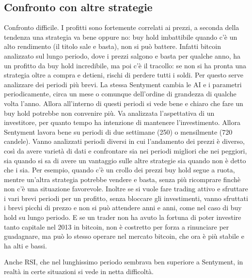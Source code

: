\documentclass[a4paper,12pt]{report}
\begin{document}
\begin{fig}
\section{Confronto con altre strategie}
Confronto difficile. I profitti sono fortemente correlati ai prezzi, a seconda della tendenza una strategia va bene oppure no: buy hold imbattibile quando c'è un alto rendimento (il titolo sale e basta), non si può battere. Infatti bitcoin analizzato sul lungo periodo, dove i prezzi salgono e basta per qualche anno, ha un profitto da buy hold incredibile, ma poi c'è il tracollo: se non si ha pronta una strategia oltre a compra e detieni, rischi di perdere tutti i soldi.
Per questo serve analizzare dei periodi più brevi. La stessa Sentyment cambia le AI e i parametri periodicamente, circa un mese o comunque dell'ordine di grandezza di qualche volta l'anno. Allora all'interno di questi periodi si vede bene e chiaro che fare un buy hold potrebbe non convenire più. Va analizzata l'aspettativa di un investitore, per quanto tempo ha intenzione di mantenere l'investimento.
Allora Sentyment lavora bene su periodi di due settimane (250) o mensilmente (720 candele). Vanno analizzati periodi diversi in cui l'andamento dei prezzi è diverso, così da avere varietà di dati e confrontare sia nei periodi migliori che nei peggiori, sia quando si sa di avere un vantaggio sulle altre strategie sia quando non è detto che i sia.
Per esempio, quando c'è un crollo dei prezzi buy hold segue a ruota, mentre un'altra strategia potrebbe vendere e basta, senza più ricomprare finchè non c'è una situazione favorevole. 
Inoltre se si vuole fare trading attivo e sfruttare i vari brevi periodi per un profitto, senza bloccare gli investimenti, vanno sfruttati i brevi picchi di prezzo e non si può attendere anni e anni, come nel caso di buy hold su lungo periodo. E se un trader non ha avuto la fortuna di poter investire tanto capitale nel 2013 in bitcoin, non è costretto per forza a rinunciare per guadagnare, ma può lo stesso operare nel mercato bitcoin, che ora è più stabile e ha alti e bassi.

Anche RSI, che nel lunghissimo periodo sembrava ben superiore a Sentyment, in realtà in certe situazioni si vede in netta difficoltà.


\end{fig}
\end{document}
